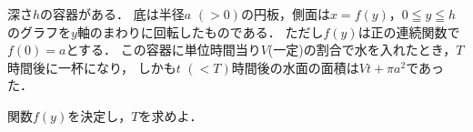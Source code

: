 \documentclass[../../main.tex]{subfiles}
\begin{document}
深さ$h$の容器がある．
底は半径$a$ $(>0)$の円板，側面は$x=f(y)$，$0 \leqq y \leqq h$のグラフを$y$軸のまわりに回転したものである．
ただし$f(y)$は正の連続関数で$f(0)=a$とする．
この容器に単位時間当り$V$(一定)の割合で水を入れたとき，$T$時間後に一杯になり，
しかも$t$ $(<T)$時間後の水面の面積は$Vt+\pi a^2$であった．

関数$f(y)$を決定し，$T$を求めよ．
\end{document}
